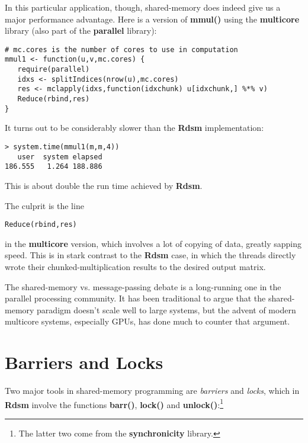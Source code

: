\documentclass[11pt]{article}
\begin{document}
In this particular application, though, shared-memory does indeed 
give us a major performance advantage.  Here is a version of {\bf
mmul()} using the {\bf multicore} library (also part of the {\bf
parallel} library):

\begin{lstlisting}
# mc.cores is the number of cores to use in computation
mmul1 <- function(u,v,mc.cores) {
   require(parallel)
   idxs <- splitIndices(nrow(u),mc.cores)
   res <- mclapply(idxs,function(idxchunk) u[idxchunk,] %*% v)
   Reduce(rbind,res)
}
\end{lstlisting}

It turns out to be considerably slower than the {\bf Rdsm}
implementation:

\begin{lstlisting}
> system.time(mmul1(m,m,4))
   user  system elapsed
186.555   1.264 188.886
\end{lstlisting}

This is about double the run time achieved by {\bf Rdsm}.  

The culprit is the line 

\begin{lstlisting}
Reduce(rbind,res)
\end{lstlisting}

in the {\bf multicore} version, which involves a lot of copying of data,
greatly sapping speed.  This is in stark contrast to the {\bf Rdsm}
case, in which the threads directly wrote their chunked-multiplication
results to the desired output matrix.

The shared-memory vs. message-passing debate is a long-running one in
the parallel processing community.  It has been traditional to argue
that the shared-memory paradigm doesn't scale well to large systems, but
the advent of modern multicore systems, especially GPUs, has done much
to counter that argument.

\section{Barriers and Locks}

Two major tools in shared-memory programming are {\it barriers} and {\it
locks}, which in {\bf Rdsm} involve the functions {\bf barr()}, {\bf
lock()} and {\bf unlock()}:\footnote{The latter two come from the {\bf
synchronicity} library.}
\end{document}

